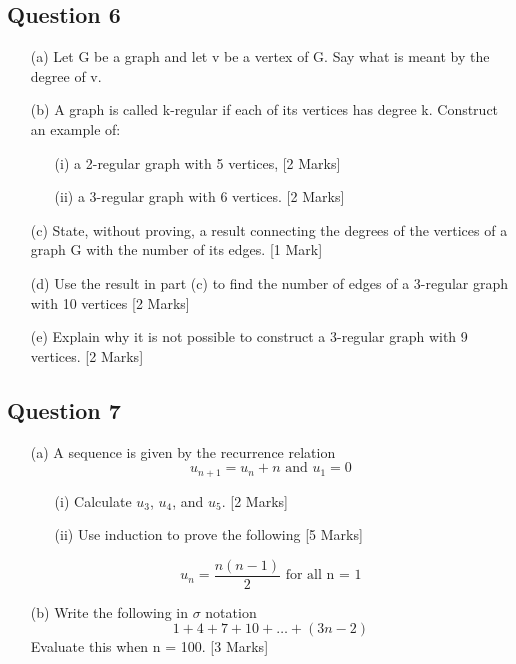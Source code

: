 \documentclass[a4paper,12pt]{article}
\begin{document}
\subsection*{Question 6}
\begin{itemize}
\item[(a)] Let G be a graph and let v be a vertex of G. Say what is meant by the degree
of v. \newline [1 Mark]
\item[(b)] A graph is called k-regular if each of its vertices has degree k. Construct an
example of:
\begin{itemize}
\item[(i)] a 2-regular graph with 5 vertices, [2 Marks]
\item[(ii)] a 3-regular graph with 6 vertices. [2 Marks]
\end{itemize}
\item[(c)] State, without proving, a result connecting the degrees of the vertices of
a graph G with the number of its edges. [1 Mark]
\item[(d)] Use the result in part (c) to find the number of edges of a 3-regular graph with 10
vertices [2 Marks]
\item[(e)] Explain why it is not possible to construct a 3-regular graph with 9 vertices. [2 Marks]

\end{itemize}
\subsection*{Question 7}

\begin{itemize}
\item[(a)] A sequence is given by the recurrence relation
\[u_{n+1} = u_n + n \mbox{ and }u_1 = 0\]
\begin{itemize}
\item[(i)] Calculate $u_3$, $u_4$, and $u_5$. [2 Marks]
\item[(ii)] Use induction to prove the following [5 Marks]
\end{itemize}
\[u_n = \frac{n(n-1)}{2} \mbox{ for all n = 1} \]

\item[(b)] Write the following in $\sigma$ notation
\[ 1 + 4 + 7 + 10 + \ldots + (3n - 2)\]
Evaluate this when n = 100. [3 Marks]
\end{itemize}

\end{document}

